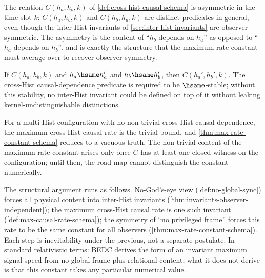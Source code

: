 \begin{lemma}
\label{lem:causal-asymmetric-time-schema}
The relation \(C(h_a, h_b, k)\) of \autoref{def:cross-hist-causal-schema} is asymmetric in the time slot \(k\): \(C(h_a, h_b, k)\) and \(C(h_b, h_a, k)\) are distinct predicates in general, even though the inter-Hist invariants of \autoref{sec:inter-hist-invariants} are observer-symmetric. The asymmetry is the content of ``\(h_b\) depends on \(h_a\)'' as opposed to ``\(h_a\) depends on \(h_b\)'', and is exactly the structure that the maximum-rate constant must average over to recover observer symmetry.
\end{lemma}
\begin{lemma}
\label{lem:causal-hsame-schema}
If \(C(h_a, h_b, k)\) and \(h_a \hsame h_a'\) and \(h_b \hsame h_b'\), then \(C(h_a', h_b', k)\). The cross-Hist causal-dependence predicate is required to be \(\hsame\)-stable; without this stability, no inter-Hist invariant could be defined on top of it without leaking kernel-undistinguishable distinctions.
\end{lemma}
\begin{proposition}
\label{prop:max-rate-trivial-schema}
For a multi-Hist configuration with no non-trivial cross-Hist causal dependence, the maximum cross-Hist causal rate is the trivial bound, and \autoref{thm:max-rate-constant-schema} reduces to a vacuous truth. The non-trivial content of the maximum-rate constant arises only once \(C\) has at least one closed witness on the configuration; until then, the road-map cannot distinguish the constant numerically.
\end{proposition}
\begin{remark}
\label{rem:light-speed-like}
The structural argument runs as follows. No-God's-eye view (\autoref{def:no-global-sync}) forces all physical content into inter-Hist invariants (\autoref{thm:invariants-observer-independent}); the maximum cross-Hist causal rate is one such invariant (\autoref{def:max-causal-rate-schema}); the symmetry of ``no privileged frame'' forces this rate to be the same constant for all observers (\autoref{thm:max-rate-constant-schema}). Each step is inevitability under the previous, not a separate postulate. In standard relativistic terms: BEDC derives the form of an invariant maximum signal speed from no-global-frame plus relational content; what it does not derive is that this constant takes any particular numerical value.
\end{remark}

